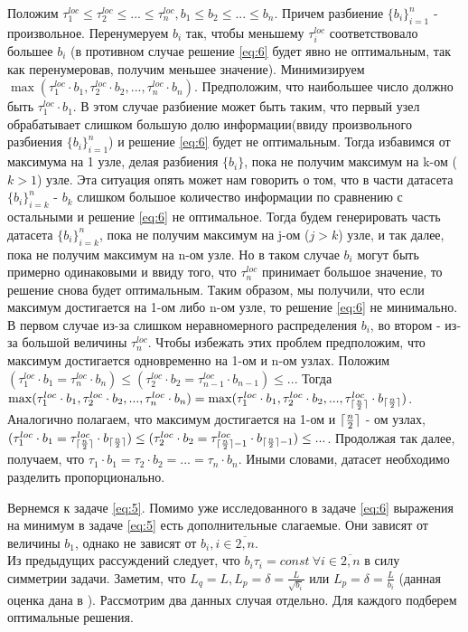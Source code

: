 \documentclass{article}
\DeclarePairedDelimiter\ceil{\lceil}{\rceil}
\begin{document}
Положим $\tau_1^{loc}\leq \tau_2^{loc}\leq ... \leq \tau_n^{loc}, b_1\leq b_2\leq ... \leq b_n$. Причем разбиение $\{b_i\}_{i = 1}^n$ - произвольное. Перенумеруем $b_i$ так, чтобы меньшему $\tau_i^{loc}$ соответствовало большее $b_i$ (в противном случае решение \ref{eq:6} будет явно не оптимальным, так как перенумеровав, получим меньшее значение). Минимизируем $\max(\tau_1^{loc}\cdot b_1, \tau_2^{loc}\cdot b_2, ..., \tau_n^{loc}\cdot b_n)$. Предположим, что наибольшее число должно быть $\tau_1^{loc}\cdot b_1$. В этом случае разбиение может быть таким, что первый узел обрабатывает слишком большую долю информации(ввиду произвольного разбиения $\{b_i\}_{i = 1}^n$) и решение \ref{eq:6} будет не оптимальным. Тогда избавимся от максимума на 1 узле, делая разбиения $\{b_i\}$, пока не получим максимум на k-ом ($k > 1$) узле. Эта ситуация опять может нам говорить о том, что в части датасета $\{b_i\}_{i = k}^n$ - $b_k$ слишком большое количество информации по сравнению с остальными и решение \ref{eq:6} не оптимальное. Тогда будем генерировать часть датасета $\{b_i\}_{i = k}^n$, пока не получим максимум на j-ом ($j > k$) узле, и так далее, пока не получим максимум на n-ом узле. Но в таком случае $b_i$ могут быть примерно одинаковыми и ввиду того, что $\tau_n^{loc}$ принимает большое значение, то решение снова будет оптимальным. Таким образом, мы получили, что если максимум достигается на 1-ом либо n-ом узле, то решение \ref{eq:6} не минимально. В первом случае из-за слишком неравномерного распределения $b_i$, во втором - из-за большой величины $\tau_n^{loc}$. Чтобы избежать этих проблем предположим, что максимум достигается одновременно на 1-ом и n-ом узлах. Положим $(\tau_1^{loc}\cdot b_1 = \tau_n^{loc}\cdot b_n)\leq (\tau_2^{loc}\cdot b_2 = \tau_{n-1}^{loc}\cdot b_{n-1})\leq ...$ Тогда $\max(\tau_1^{loc}\cdot b_1, \tau_2^{loc}\cdot b_2, ..., \tau_n^{loc}\cdot b_n) = \max(\tau_1^{loc}\cdot b_1, \tau_2^{loc}\cdot b_2, ..., \tau_{\ceil{\frac{n}{2}}}^{loc}\cdot b_{\ceil{\frac{n}{2}}})$. Аналогично полагаем, что максимум достигается на 1-ом и $\ceil{\frac{n}{2}}$ - ом узлах, $(\tau_1^{loc}\cdot b_1 = \tau_{\ceil{\frac{n}{2}}}^{loc}\cdot b_{\ceil{\frac{n}{2}}})\leq (\tau_2^{loc}\cdot b_2 = \tau_{\ceil{\frac{n}{2}}-1}^{loc}\cdot b_{\ceil{\frac{n}{2}}-1})\leq ...$. Продолжая так далее, получаем, что $\tau_1\cdot b_1 = \tau_2\cdot b_2 = ... = \tau_n\cdot b_n$. Иными словами, датасет необходимо разделить пропорционально.

Вернемся к задаче \ref{eq:5}. Помимо уже исследованного в задаче \ref{eq:6} выражения на минимум в задаче \ref{eq:5} есть дополнительные слагаемые. Они зависят от величины $b_1$, однако не зависят от $b_i, i \in \overline{2, n}$.
\\
Из предыдущих рассуждений следует, что $b_i \tau _i = const ~ \forall i \in \overline{2, n}$  в силу симметрии задачи. Заметим, что $L_q = L, L_p = \delta = \frac{L}{\sqrt{b_i}}$ или $L_p = \delta = \frac{L}{b_i}$ (данная оценка дана в \cite{kovalev2022optimal}). Рассмотрим два данных случая отдельно. Для каждого подберем оптимальные решения.
\\
\end{document}
